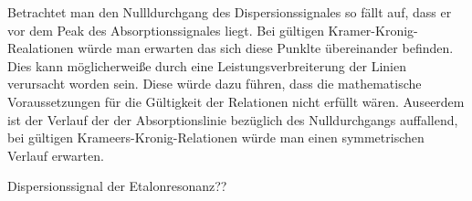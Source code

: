 Betrachtet man den Nullldurchgang des Dispersionssignales so fällt auf, dass er vor dem Peak des Absorptionssignales liegt. Bei gültigen Kramer-Kronig-Realationen würde man erwarten das sich diese Punklte übereinander befinden. Dies kann möglicherweiße durch eine Leistungsverbreiterung der Linien verursacht worden sein. Diese würde dazu führen, dass die mathematische Voraussetzungen für die Gültigkeit der Relationen nicht erfüllt wären.
Auseerdem ist der Verlauf der der Absorptionslinie bezüglich des Nulldurchgangs auffallend, bei gültigen Krameers-Kronig-Relationen würde man einen symmetrischen Verlauf erwarten.

Dispersionssignal der Etalonresonanz??